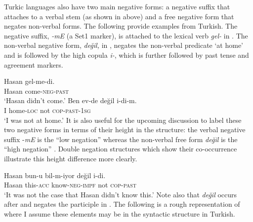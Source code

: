 \documentclass[output=paper]{langsci/langscibook}
\begin{document}
Turkic languages also have two main negative forms: 
a negative suffix that attaches to a verbal stem (as shown in  above) 
and a free negative form that negates non-verbal forms. 
The following provide examples from Turkish. 
The negative suffix, \textit{-mE} (a Set1 marker), is attached to the lexical verb \textit{gel-} in . 
The non-verbal negative form, \textit{değil,} in , negates the non-verbal predicate `at home' 
and is followed by the high copula \textit{i-}, which is further followed by past tense and agreement markers.

\ea%
    \label{kelepirex:key:7}
    \ea%
        \label{kelepirex:key:7a}
        \gll Hasan gel-me-di.\\
        Hasan come-\textsc{neg}{}-\textsc{past}\\
        \glt `Hasan didn't come.'
    \ex%
        \label{kelepirex:key:7b}
        \gll Ben ev-de değil i-di-m.\\
        I home-\textsc{loc} not  \textsc{cop}{}-\textsc{past}{}-\textsc{1sg} \\
        \glt `I was not at home.'
    \z
\z
It is also useful for the upcoming discussion to label these two negative forms in terms of their height in the structure: 
the verbal negative suffix -\textit{mE} is the ``low negation'' 
whereas the non-verbal free form \textit{değil} is the ``high negation'' \citep{Kelepir2001}. 
Double negation structures which show their co-occurrence illustrate this height difference more clearly.

\ea%
    \label{kelepirex:key:8}
    \gll Hasan bun-u bil-m-iyor değil i-di.\\
    Hasan this-\textsc{acc} know-\textsc{neg}{}-\textsc{impf} not   \textsc{cop}{}-\textsc{past}    \\
    \glt `It was not the case that Hasan didn't know this.'
    \z
Note also that \textit{değil} occurs after and negates the participle in .
The following is a rough representation of where I assume these elements may be in the syntactic structure in Turkish.
\end{document}
